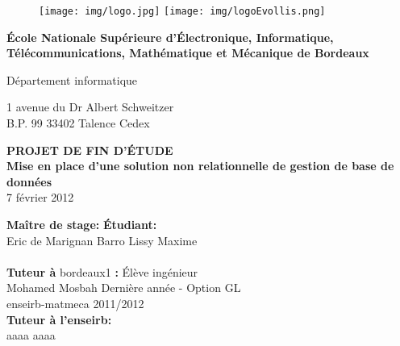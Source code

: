 \def\logo{
  \begin {figure}[H]
	\texttt{[image: img/logo.jpg]}
        \hspace{8.8cm}
	\texttt{[image: img/logoEvollis.png]}
	\label{logo}
  \end {figure}
}

\def\title{Mise en place d'une solution non relationnelle de gestion de base de données}

\def\intervenant{
        \begin{flushleft}
	  \begin{tabbing}
		\textbf{Maître de stage:}
                \hspace{7.2cm} \=\textbf{Étudiant:} \\
                \noindent Eric de {\sc Marignan}
                \> {\sc Barro} Lissy Maxime\\
                \> \\
                \noindent \textbf{Tuteur à} {\sc bordeaux}1 {\bf :}
                \> Élève ingénieur\\
                \noindent Mohamed {\sc Mosbah}
                \> Dernière année - Option GL \\ 
                \> {\sc enseirb-matmeca} 2011/2012 \\
                \noindent \textbf{Tuteur à l'{\sc enseirb}:}
                \> \\
                \noindent aaaa {\sc aaaa}
	  \end{tabbing}
        \end{flushleft}
}

\begin{titlepage}
  \logo
  \begin{flushleft}
    \textbf{École Nationale Supérieure d’Électronique, Informatique,
      Télécommunications, Mathématique et Mécanique de Bordeaux}

    \vspace{0.5cm}

    \textsf{Département informatique}

    \vspace{0.5cm}

   1 avenue du Dr Albert Schweitzer\\
   B.P. 99 33402 Talence Cedex

    
  \end{flushleft}
  
  \vspace{4cm}
	\begin{center}
	  {\bf PROJET DE FIN D'ÉTUDE}\\
	  \vspace{1cm}
		 {\LARGE\bf \title}\\
\vspace{1cm}
           7 février 2012 %

	\end{center}


        \vspace{4cm}
        \intervenant

\newpage


\end{titlepage}
